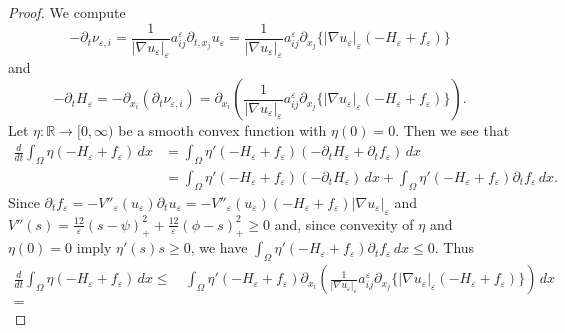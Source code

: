 \documentclass{amsart}
\theoremstyle{definition}
\def\R{{\mathbb{R}}}
\begin{document}
\begin{proof}
We compute
\begin{equation}
-\partial _t \nu_{\varepsilon,i}
=\frac{1}{|\nabla u_\varepsilon|_\varepsilon}
a^\varepsilon _{ij}
\partial_{t, x_j} u_\varepsilon
=
\frac{1}{|\nabla u_\varepsilon|_\varepsilon}
a^\varepsilon _{ij}
\partial_{x_j} \{ |\nabla u_\varepsilon|_\varepsilon (-H_\varepsilon + f_\varepsilon) \}
\end{equation}
and
\begin{equation}
-\partial _t H_{\varepsilon}
=-\partial_{x_i} (\partial _t \nu_{\varepsilon,i})
=\partial_{x_i}
\left(
\frac{1}{|\nabla u_\varepsilon|_\varepsilon}
a^\varepsilon _{ij}
\partial_{x_j} \{ |\nabla u_\varepsilon|_\varepsilon (-H_\varepsilon + f_\varepsilon) \}
\right).
\end{equation}
Let $\eta :\R\to [0,\infty)$ be a smooth convex 
function with $\eta (0)=0$.
Then we see that
\begin{equation}
\begin{split}
    \frac{d}{dt}
    \int_{\Omega} \eta (-H_\varepsilon + f_\varepsilon) \, dx
    &= \int_{\Omega} \eta' (-H_\varepsilon + f_\varepsilon) (-\partial _t H_\varepsilon + \partial _t f_\varepsilon) \, dx \\
    &=  
    \int_{\Omega} \eta' (-H_\varepsilon + f_\varepsilon) (-\partial _t H_\varepsilon)  \, dx
    +
        \int_{\Omega} \eta' (-H_\varepsilon + f_\varepsilon) \partial_t f _\varepsilon \, dx.
\end{split}
\end{equation}
Since $\partial_t f_\varepsilon = -V''_\varepsilon (u_\varepsilon)\partial_t u_\varepsilon=-V''_\varepsilon (u_\varepsilon)(-H_\varepsilon+f_\varepsilon)|\nabla u_\varepsilon|_\varepsilon$ and $V''(s)
=\frac{12}{\varepsilon} (s-\psi )_+^2 
+\frac{12}{\varepsilon} (\phi -s )_+^2 \geq 0$ 
and, since convexity of $\eta$ and $\eta(0)=0$ imply $\eta' (s) s \geq 0$, we have $\int_{\Omega} \eta' (-H_\varepsilon + f_\varepsilon)\partial _t f_\varepsilon \, dx \leq 0.$
Thus
\begin{equation*}
\begin{split}
    \frac{d}{dt}
    \int_{\Omega} \eta (-H_\varepsilon + f_\varepsilon) \, dx
  	\leq &\,
    \int_{\Omega} \eta' (-H_\varepsilon + f_\varepsilon) 
    \partial_{x_i}
    \left(
    \frac{1}{|\nabla u_\varepsilon|_\varepsilon}
    a^\varepsilon _{ij}
    \partial_{x_j} \{ |\nabla u_\varepsilon|_\varepsilon (-H_\varepsilon + f_\varepsilon) \}
    \right) \, dx \\
    = & \,

\end{split}
\end{equation*}
\end{proof}
\end{document}
